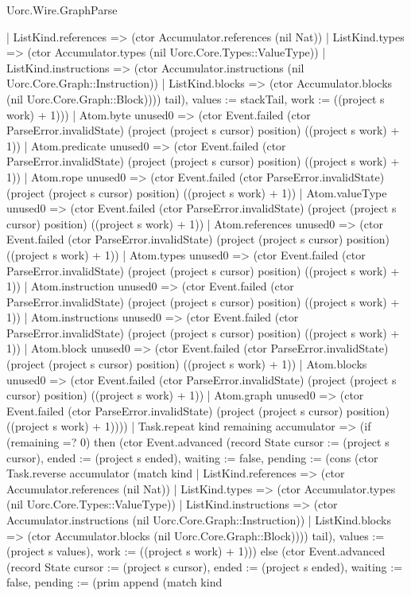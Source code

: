 \begin{lexlean}{Uorc.Wire.GraphParse}
\begin{semanticmodule}
{{            | ListKind.references => (ctor Accumulator.references (nil Nat))
            | ListKind.types => (ctor Accumulator.types (nil Uorc.Core.Types::ValueType))
            | ListKind.instructions => (ctor Accumulator.instructions (nil Uorc.Core.Graph::Instruction))
            | ListKind.blocks => (ctor Accumulator.blocks (nil Uorc.Core.Graph::Block)))) tail), values := stackTail, work := ((project s work) + 1)}))
          | Atom.byte unused0 => (ctor Event.failed (ctor ParseError.invalidState) (project (project s cursor) position) ((project s work) + 1))
          | Atom.predicate unused0 => (ctor Event.failed (ctor ParseError.invalidState) (project (project s cursor) position) ((project s work) + 1))
          | Atom.rope unused0 => (ctor Event.failed (ctor ParseError.invalidState) (project (project s cursor) position) ((project s work) + 1))
          | Atom.valueType unused0 => (ctor Event.failed (ctor ParseError.invalidState) (project (project s cursor) position) ((project s work) + 1))
          | Atom.references unused0 => (ctor Event.failed (ctor ParseError.invalidState) (project (project s cursor) position) ((project s work) + 1))
          | Atom.types unused0 => (ctor Event.failed (ctor ParseError.invalidState) (project (project s cursor) position) ((project s work) + 1))
          | Atom.instruction unused0 => (ctor Event.failed (ctor ParseError.invalidState) (project (project s cursor) position) ((project s work) + 1))
          | Atom.instructions unused0 => (ctor Event.failed (ctor ParseError.invalidState) (project (project s cursor) position) ((project s work) + 1))
          | Atom.block unused0 => (ctor Event.failed (ctor ParseError.invalidState) (project (project s cursor) position) ((project s work) + 1))
          | Atom.blocks unused0 => (ctor Event.failed (ctor ParseError.invalidState) (project (project s cursor) position) ((project s work) + 1))
          | Atom.graph unused0 => (ctor Event.failed (ctor ParseError.invalidState) (project (project s cursor) position) ((project s work) + 1))))
      | Task.repeat kind remaining accumulator => (if (remaining =? 0) then (ctor Event.advanced (record State {cursor := (project s cursor), ended := (project s ended), waiting := false, pending := (cons (ctor Task.reverse accumulator (match kind
        | ListKind.references => (ctor Accumulator.references (nil Nat))
        | ListKind.types => (ctor Accumulator.types (nil Uorc.Core.Types::ValueType))
        | ListKind.instructions => (ctor Accumulator.instructions (nil Uorc.Core.Graph::Instruction))
        | ListKind.blocks => (ctor Accumulator.blocks (nil Uorc.Core.Graph::Block)))) tail), values := (project s values), work := ((project s work) + 1)})) else (ctor Event.advanced (record State {cursor := (project s cursor), ended := (project s ended), waiting := false, pending := (prim append (match kind
}}
\end{semanticmodule}
\end{lexlean}
